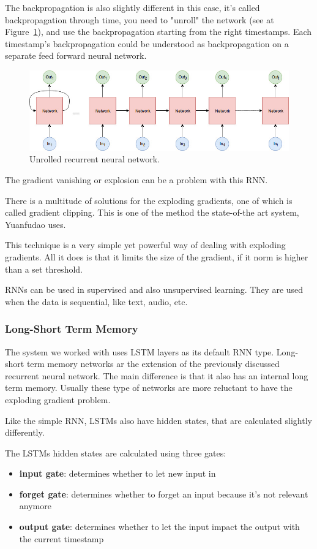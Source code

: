 The backpropagation is also slightly different in this case, it's called backpropagation through time, you need to "unroll" the network (see at Figure~\ref{fig:unrolled}), and use the backpropagation starting from the right timestamps. Each timestamp's backpropagation could be understood as backpropagation on a separate feed forward neural network. 
\begin{figure}[!htb]
	\centering
	\includegraphics[scale=0.5]{unrolled.jpg}
	\caption{Unrolled recurrent neural network.}
	\label{fig:unrolled}
\end{figure}

The gradient vanishing or explosion can be a problem with this RNN.

There is a multitude of solutions for the exploding gradients, one of which is called gradient clipping. This is one of the method the state-of-the art system, Yuanfudao uses.

This technique is a very simple yet powerful way of dealing with exploding gradients. All it does is that it limits the size of the gradient, if it norm is higher than a set threshold.

RNNs can be used in supervised and also unsupervised learning. They are used when the data is sequential, like text, audio, etc.

\subsubsection{Long-Short Term Memory}
The system we worked with uses LSTM layers as its default RNN type.
Long-short term memory networks ar the extension of the previously discussed recurrent neural network. The main difference is that it also has an internal long term memory. Usually these type of networks are more reluctant to have the exploding gradient problem.

Like the simple RNN, LSTMs also have hidden states, that are calculated slightly differently.
\\

\begin{minipage}{\textwidth}
The LSTMs hidden states are calculated using three gates:
\begin{itemize}
	\item \textbf{input gate}: determines whether to let new input in
	\item \textbf{forget gate}: determines whether to forget an input because it's not relevant anymore
	\item \textbf{output gate}: determines whether to let the input impact the output with the current timestamp
\end{itemize}
\end{minipage}

